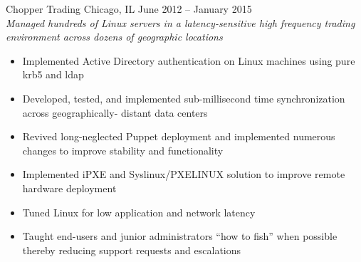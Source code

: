 \documentclass[9pt]{extarticle} %
\begin{document}
\begin{minipage}[c]{\textwidth}

	\begin{indented}
		Chopper Trading \tab Chicago, IL \tab June 2012 -- January 2015\\
		\textit{Managed hundreds of Linux servers in a latency-sensitive high frequency trading environment across dozens of geographic locations}
		\begin{itemize}
			\item Implemented Active Directory authentication on Linux machines using pure krb5 and ldap
			\item Developed, tested, and implemented sub-millisecond time synchronization across geographically- distant data centers
			\item Revived long-neglected Puppet deployment and implemented numerous changes to improve stability and functionality
			\item Implemented iPXE and Syslinux/PXELINUX solution to improve remote hardware deployment
			\item Tuned Linux for low application and network latency
			\item Taught end-users and junior administrators ``how to fish'' when possible thereby reducing support requests and escalations
		\end{itemize}
	\end{indented}
\end{minipage}

\bigskip

\end{document}
